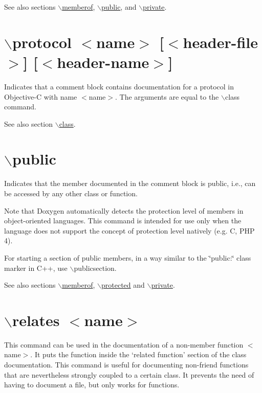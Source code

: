 \begin{DoxySeeAlso}{See also}
sections \hyperlink{commands_cmdmemberof}{$\backslash$memberof}, \hyperlink{commands_cmdpublic}{$\backslash$public}, and \hyperlink{commands_cmdprivate}{$\backslash$private}.
\end{DoxySeeAlso}


 \hypertarget{commands_cmdprotocol}{}\section{$\backslash$protocol $<$name$>$ \mbox{[}$<$header-\/file$>$\mbox{]} \mbox{[}$<$header-\/name$>$\mbox{]}}\label{commands_cmdprotocol}
 Indicates that a comment block contains documentation for a protocol in Objective-\/C with name $<$name$>$. The arguments are equal to the $\backslash$class command.

\begin{DoxySeeAlso}{See also}
section \hyperlink{commands_cmdclass}{$\backslash$class}.
\end{DoxySeeAlso}


 \hypertarget{commands_cmdpublic}{}\section{$\backslash$public}\label{commands_cmdpublic}
  Indicates that the member documented in the comment block is public, i.e., can be accessed by any other class or function.

Note that Doxygen automatically detects the protection level of members in object-\/oriented languages. This command is intended for use only when the language does not support the concept of protection level natively (e.g. C, PHP 4).

For starting a section of public members, in a way similar to the \char`\"{}public:\char`\"{} class marker in C++, use $\backslash$publicsection.

\begin{DoxySeeAlso}{See also}
sections \hyperlink{commands_cmdmemberof}{$\backslash$memberof}, \hyperlink{commands_cmdprotected}{$\backslash$protected} and \hyperlink{commands_cmdprivate}{$\backslash$private}.
\end{DoxySeeAlso}


 \hypertarget{commands_cmdrelates}{}\section{$\backslash$relates $<$name$>$}\label{commands_cmdrelates}
 This command can be used in the documentation of a non-\/member function $<$name$>$. It puts the function inside the `related function' section of the class documentation. This command is useful for documenting non-\/friend functions that are nevertheless strongly coupled to a certain class. It prevents the need of having to document a file, but only works for functions.

